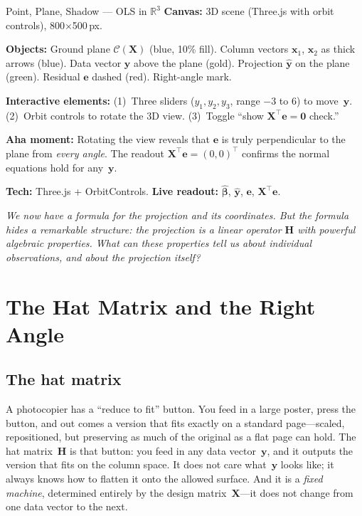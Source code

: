 \documentclass[11pt,a4paper]{article}
\theoremstyle{plain}
\theoremstyle{definition}
\newcommand{\R}{\mathbb{R}}
\newcommand{\yhat}{\hat{\bm{y}}}
\newcommand{\bhat}{\hat{\bm{\beta}}}
\newcommand{\bX}{\bm{X}}
\newcommand{\by}{\bm{y}}
\newcommand{\be}{\bm{e}}
\newcommand{\bH}{\bm{H}}
\newcommand{\Col}{\mathcal{C}}
\begin{document}
\begin{vizspec}{Point, Plane, Shadow --- OLS in $\R^3$}
\textbf{Canvas:} 3D scene (Three.js with orbit controls), 800$\times$500\,px.

\textbf{Objects:} Ground plane $\Col(\bX)$ (\textcolor{colspace}{blue}, 10\% fill).
Column vectors $\bm{x}_1$, $\bm{x}_2$ as thick arrows (\textcolor{colspace}{blue}).
Data vector $\by$ above the plane (\textcolor{response}{gold}).
Projection $\yhat$ on the plane (\textcolor{projection}{green}).
Residual $\be$ dashed (\textcolor{residual}{red}).  Right-angle mark.

\textbf{Interactive elements:}
(1)~Three sliders ($y_1, y_2, y_3$, range $-3$ to $6$) to move~$\by$.
(2)~Orbit controls to rotate the 3D view.
(3)~Toggle ``show $\bX^\top\be = \bm{0}$ check.''

\textbf{Aha moment:} Rotating the view reveals that $\be$ is truly
perpendicular to the plane from \emph{every angle}.  The readout
$\bX^\top\be = (0, 0)^\top$ confirms the normal equations hold for any~$\by$.

\textbf{Tech:} Three.js + OrbitControls.
\quad \textbf{Live readout:} $\bhat$, $\yhat$, $\be$, $\bX^\top\be$.
\end{vizspec}

\medskip
\noindent\textit{We now have a formula for the projection and its
coordinates.
But the formula hides a remarkable structure: the projection is a
\emph{linear operator} $\bH$ with powerful algebraic properties.
What can these properties tell us about individual observations,
and about the projection itself?}


\section{The Hat Matrix and the Right Angle}\label{sec:hat}

\subsection{The hat matrix}

\begin{toystory}
A photocopier has a ``reduce to fit'' button.  You feed in a large
poster, press the button, and out comes a version that fits exactly on a
standard page---scaled, repositioned, but preserving as much of the
original as a flat page can hold.  The hat matrix~$\bH$ is that button:
you feed in any data vector~$\by$, and it outputs the version that fits
on the column space.  It does not care what~$\by$ looks like; it always
knows how to flatten it onto the allowed surface.  And it is a
\emph{fixed machine}, determined entirely by the design matrix~$\bX$---it
does not change from one data vector to the next.
\end{toystory}
\end{document}
